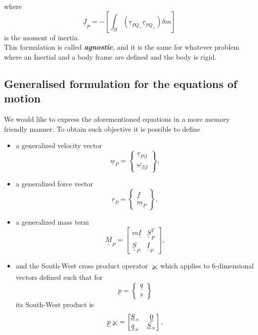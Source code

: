 where 
\begin{equation}
    \underline{\underline{J}}_P = -\left[\int_B(\underline{r}_{PQ_\times}\underline{r}_{PQ_\times})\delta m\right]
\end{equation}
is the moment of inertia.
\\
This formulation is called \textit{\textbf{agnostic}}, and it is the same for whatever problem where an Inertial and a body frame are defined and the body is rigid.
\subsection{Generalised formulation for the equations of motion}
We would like to express the aforementioned equations in a more memory friendly manner. To obtain such objective it is possible to define
\begin{itemize}
    \item a generalized velocity vector
\begin{equation}
    \underline{w}_P = \begin{Bmatrix}
        \underline{v}_{P|I}\\
        \underline{\omega}_{\beta|I}
    \end{Bmatrix},
\end{equation}
\item a generalized force vector
\begin{equation}
    \underline{r}_P = \begin{Bmatrix}
        \underline{f}\\
        \underline{m}_P
    \end{Bmatrix},
\end{equation}
\item a generalized mass term
\begin{equation}
    \underline{\underline{M}}_P = \begin{bmatrix}
        m\underline{\underline{I}} & \underline{\underline{S}}_P^T\\
        \underline{\underline{S}}_P & \underline{\underline{I}}_P
    \end{bmatrix},
\end{equation}
\item and the South-West cross product operator $\swcross$ which applies to 6-dimensional vectors defined such that for
\begin{equation}
    \underline{p} = \begin{Bmatrix}
        \underline{q}\\
        \underline{s}
    \end{Bmatrix}
\end{equation}
its South-West product is
\begin{equation}
    \underline{p}\swcross = \begin{bmatrix}
        \underline{S}_\times & \underline{\underline{0}}\\
        \underline{q}_\times & \underline{S}_\times
    \end{bmatrix}.
\end{equation}
\end{itemize}

